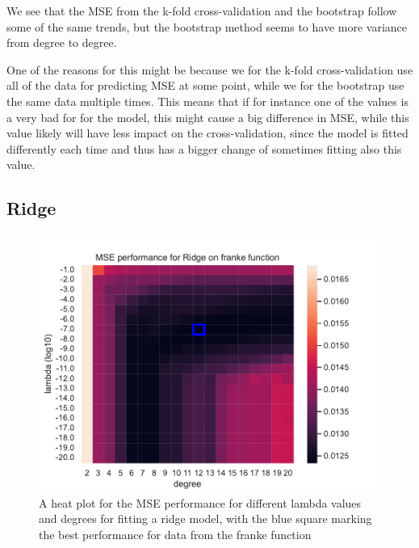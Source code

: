 \documentclass[12pt]{article}
\begin{document}
We see that the MSE from the k-fold cross-validation and the bootstrap follow some of the same trends, but the bootstrap method seems to have more variance from degree to degree.

One of the reasons for this might be because we for the k-fold cross-validation use all of the data for predicting MSE at some point, while we for the bootstrap use the same data multiple times.
This means that if for instance one of the values is a very bad for for the model, this might cause a big difference in MSE, while this value likely will have less impact on the cross-validation, since the model is fitted differently each time and thus has a bigger change of sometimes fitting also this value.

\subsection{Ridge}

\begin{figure}[H]
    \centering
    \includegraphics[width=0.8\columnwidth]{../src/output/mse_heat_plot_franke_function_Ridge.pdf}
    \caption{A heat plot for the MSE performance for different lambda values and degrees for fitting a ridge model, with the blue square marking the best performance for data from the franke function}
    \label{fig:mse_heat_map_franke_ridge}
\end{figure}
\end{document}
